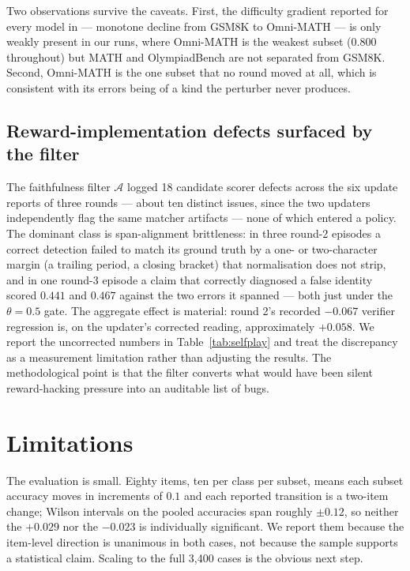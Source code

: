 \documentclass{article} %
\begin{document}
Two observations survive the caveats. First, the difficulty gradient reported for every
model in \citet{zheng2024processbench} --- monotone decline from GSM8K to Omni-MATH --- is
only weakly present in our runs, where Omni-MATH is the weakest subset ($0.800$ throughout)
but MATH and OlympiadBench are not separated from GSM8K. Second, Omni-MATH is the one subset
that no round moved at all, which is consistent with its errors being of a kind the
perturber never produces.

\subsection{Reward-implementation defects surfaced by the filter}

The faithfulness filter $\mathcal{A}$ logged 18 candidate scorer defects across the six
update reports of three rounds --- about ten distinct issues, since the two updaters
independently flag the same matcher artifacts --- none of which entered a policy. The dominant class is span-alignment brittleness: in three
round-2 episodes a correct detection failed to match its ground truth by a one- or
two-character margin (a trailing period, a closing bracket) that normalisation does not
strip, and in one round-3 episode a claim that correctly diagnosed a false identity scored
$0.441$ and $0.467$ against the two errors it spanned --- both just under the $\theta = 0.5$
gate. The aggregate effect is material: round 2's recorded $-0.067$ verifier regression is,
on the updater's corrected reading, approximately $+0.058$. We report the uncorrected numbers
in Table~\ref{tab:selfplay} and treat the discrepancy as a measurement limitation rather than
adjusting the results. The methodological point is that the filter converts what would have
been silent reward-hacking pressure into an auditable list of bugs.

\section{Limitations}

The evaluation is small. Eighty items, ten per class per subset, means each subset accuracy
moves in increments of $0.1$ and each reported transition is a two-item change; Wilson
intervals on the pooled accuracies span roughly $\pm 0.12$, so neither the $+0.029$ nor the
$-0.023$ is individually significant. We report them because the item-level direction is
unanimous in both cases, not because the sample supports a statistical claim. Scaling to the
full 3,400 cases is the obvious next step.
\end{document}

